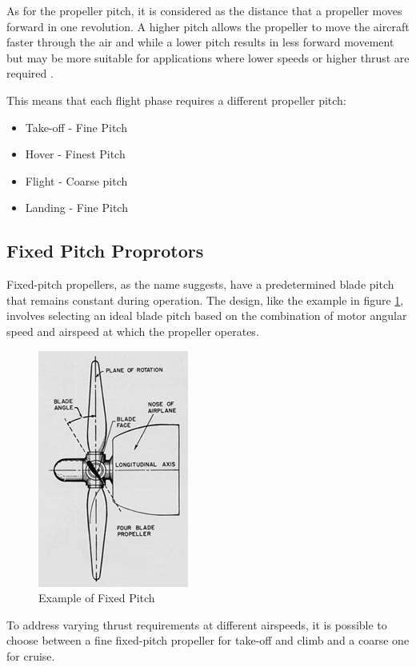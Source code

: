 As for the propeller pitch, it is considered as the distance that a propeller moves forward in one revolution.
A higher pitch allows the propeller to move the aircraft faster through the air and while a lower pitch results in less forward movement but may be more suitable for applications where lower speeds or higher thrust are required \cite{main_uav}.

This means that each flight phase requires a different propeller pitch\cite{main_uav}:
\begin{itemize}
    \item Take-off - Fine Pitch
    \item Hover - Finest Pitch
    \item Flight - Coarse pitch
    \item Landing - Fine Pitch
\end{itemize}

\subsection{Fixed Pitch Proprotors}
Fixed-pitch propellers, as the name suggests, have a predetermined blade pitch that remains constant during operation.
The design, like the example in figure \ref{fig:prop_2}, involves selecting an ideal blade pitch based on the combination of motor angular speed and airspeed at which the propeller operates.

\begin{figure}[H]
    \centering
    \includegraphics[scale=0.8]{ch2/assets/prop_2.jpg}
    \caption{Example of Fixed Pitch \cite{FPP8}}
    \label{fig:prop_2}
\end{figure}

To address varying thrust requirements at different airspeeds, it is possible to choose between a fine fixed-pitch propeller for take-off and climb and a coarse one for cruise.


